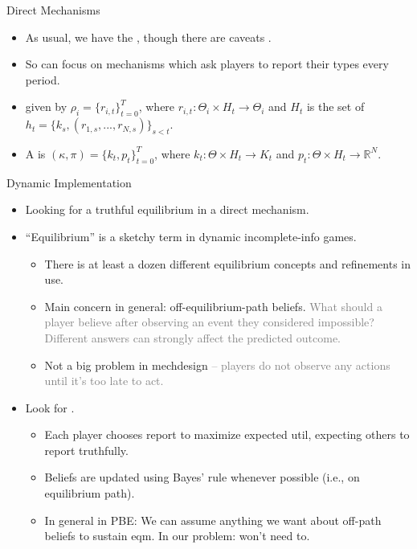 \documentclass[english,10pt
,aspectratio=169
]{beamer}
\begin{document}
\begin{frame}{Direct Mechanisms}
\begin{itemize}
	\item As usual, we have the , though there are caveats \citep{sugaya_revelation_2021}.
	\item So can focus on mechanisms which ask players to report their types every period.
	\item {} given by $\rho_i = \{r_{i,t}\}_{t=0}^T$, where $r_{i,t}: \Theta_i \times H_t \to \Theta_i$ and $H_t$ is the set of  $h_t = \{k_s,(r_{1,s},...,r_{N,s})\}_{s < t}$.
	\item A  is $(\kappa,\pi) = \{k_t,p_t\}_{t=0}^T$, where $k_t: \Theta \times H_t \to K_t$ and $p_t: \Theta \times H_t \to \mathbb{R}^N$.
\end{itemize}
\end{frame}


\begin{frame}{Dynamic Implementation}
\begin{itemize}
	\item Looking for a truthful equilibrium in a direct mechanism.
	\item ``Equilibrium'' is a sketchy term in dynamic incomplete-info games.
	\begin{itemize}
		\item There is at least a dozen different equilibrium concepts and refinements in use.
		\item Main concern in general: off-equilibrium-path beliefs. \textcolor{gray}{What should a player believe after observing an event they considered impossible? Different answers can strongly affect the predicted outcome.}
		\item Not a big problem in mechdesign \textcolor{gray}{-- players do not observe any actions until it's too late to act.}
	\end{itemize}
	\item Look for .
	\begin{itemize}
		\item Each player chooses report to maximize expected util, expecting others to report truthfully.
		\item Beliefs are updated using Bayes' rule whenever possible (i.e., on equilibrium path).
		\item In general in PBE: We can assume anything we want about off-path beliefs to sustain eqm. In our problem: won't need to.
	\end{itemize}
\end{itemize}
\end{frame}
\end{document}
